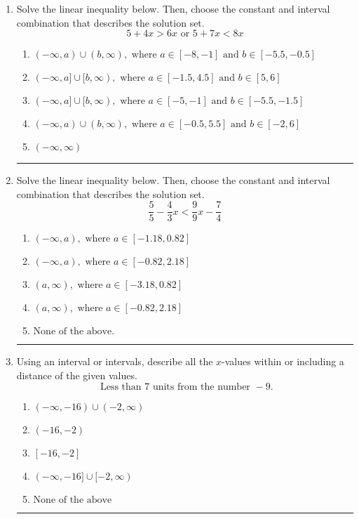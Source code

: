 \documentclass[14pt]{extbook}
\newcommand{\litem}[1]{\item#1\hspace*{-1cm}\rule{\textwidth}{0.4pt}}
\begin{document}
\begin{enumerate}
{\begin{enumerate}[label=\Alph*.]
\end{enumerate} }
\litem{
Solve the linear inequality below. Then, choose the constant and interval combination that describes the solution set.\[ 5 + 4 x > 6 x \text{ or } 5 + 7 x < 8 x \]\begin{enumerate}[label=\Alph*.]
\item \( (-\infty, a) \cup (b, \infty), \text{ where } a \in [-8, -1] \text{ and } b \in [-5.5, -0.5] \)
\item \( (-\infty, a] \cup [b, \infty), \text{ where } a \in [-1.5, 4.5] \text{ and } b \in [5, 6] \)
\item \( (-\infty, a] \cup [b, \infty), \text{ where } a \in [-5, -1] \text{ and } b \in [-5.5, -1.5] \)
\item \( (-\infty, a) \cup (b, \infty), \text{ where } a \in [-0.5, 5.5] \text{ and } b \in [-2, 6] \)
\item \( (-\infty, \infty) \)

\end{enumerate} }
\litem{
Solve the linear inequality below. Then, choose the constant and interval combination that describes the solution set.\[ \frac{5}{5} - \frac{4}{3} x < \frac{9}{9} x - \frac{7}{4} \]\begin{enumerate}[label=\Alph*.]
\item \( (-\infty, a), \text{ where } a \in [-1.18, 0.82] \)
\item \( (-\infty, a), \text{ where } a \in [-0.82, 2.18] \)
\item \( (a, \infty), \text{ where } a \in [-3.18, 0.82] \)
\item \( (a, \infty), \text{ where } a \in [-0.82, 2.18] \)
\item \( \text{None of the above}. \)

\end{enumerate} }
\litem{
Using an interval or intervals, describe all the $x$-values within or including a distance of the given values.\[ \text{ Less than } 7 \text{ units from the number } -9. \]\begin{enumerate}[label=\Alph*.]
\item \( (-\infty, -16) \cup (-2, \infty) \)
\item \( (-16, -2) \)
\item \( [-16, -2] \)
\item \( (-\infty, -16] \cup [-2, \infty) \)
\item \( \text{None of the above} \)

\end{enumerate} }
\end{enumerate}
\end{document}
